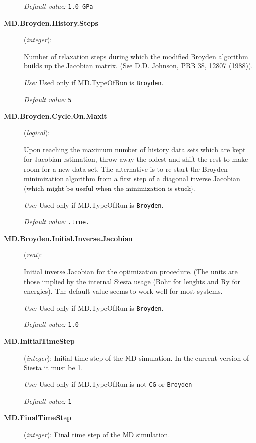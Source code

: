 \documentclass[11pt]{article}
\begin{document}
\begin{description}
{\it Default value:} {\tt 1.0 GPa}
 

\item [{\bf MD.Broyden.History.Steps}] ({\it integer}):

Number of relaxation steps during which the modified Broyden algorithm builds up
the Jacobian matrix. (See D.D. Johnson, PRB 38, 12807
(1988)).

{\it Use:} Used only if MD.TypeOfRun is {\tt Broyden}. 

{\it Default value:} {\tt 5}

\item [{\bf MD.Broyden.Cycle.On.Maxit}] ({\it logical}):

Upon reaching the maximum number of history data sets which are kept
for Jacobian estimation, throw away the oldest and shift the rest to
make room for a new data set. The alternative is to re-start the
Broyden minimization algorithm from a first step of a diagonal inverse
Jacobian (which might be useful when the minimization is
stuck). 

{\it Use:} Used only if MD.TypeOfRun is {\tt Broyden}. 

{\it Default value:} {\tt .true.}

\item[{\bf MD.Broyden.Initial.Inverse.Jacobian}] ({\it real}):

Initial inverse Jacobian for the optimization procedure. (The units 
are those implied by the internal Siesta usage (Bohr for lenghts and
Ry for energies). The default value seems to work well for most systems.

{\it Use:} Used only if MD.TypeOfRun is {\tt Broyden}. 

{\it Default value:} {\tt 1.0}

   
\item[{\bf MD.InitialTimeStep}] ({\it integer}): 
Initial time step of the MD simulation.
In the current version of {\sc Siesta} it must be 1.

{\it Use:} Used only if MD.TypeOfRun is not {\tt CG} or {\tt Broyden}
    
{\it Default value:} {\tt 1}

\item[{\bf MD.FinalTimeStep}] ({\it integer}): 
Final time step of the MD simulation.


\end{description}
\end{document}
